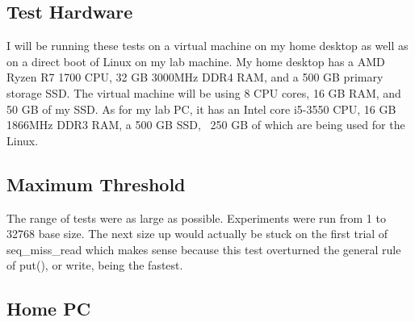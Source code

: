 \documentclass[twocolumn,11pt]{article}
\begin{document}
\subsection{Test Hardware}
\label{subsec:test_hw}

I will be running these tests on a virtual machine on my home desktop as well as
on a direct boot of Linux on my lab machine. My home desktop has a AMD Ryzen R7
1700 CPU, 32 GB 3000MHz DDR4 RAM, and a 500 GB primary storage SSD. The virtual
machine will be using 8 CPU cores, 16 GB RAM, and 50 GB of my SSD. As for my lab
PC, it has an Intel core i5-3550 CPU, 16 GB 1866MHz DDR3 RAM, a 500 GB SSD, ~250
GB of which are being used for the Linux.

\subsection{Maximum Threshold}
\label{subsec:max_threshold}

The range of tests were as large as possible. Experiments were run from 1 to
32768 base size. The next size up would actually be stuck on the first trial of
seq\_miss\_read which makes sense because this test overturned the general rule of
put(), or write, being the fastest.

\subsection{Home PC}
\end{document}
